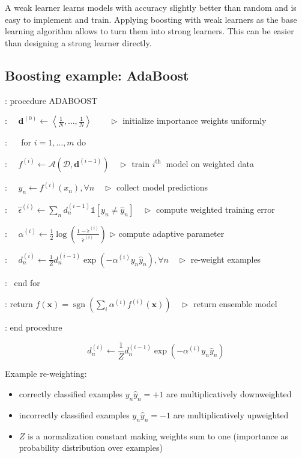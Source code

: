 \noindent
A weak learner learns models with accuracy slightly better than random and is
easy to implement and train. Applying boosting with weak learners as the base learning
algorithm allows to turn them into strong learners. This can be easier than
designing a strong learner directly.

\subsection{Boosting example: AdaBoost}

: procedure ADABOOST

:
$\quad \mathbf{d}^{(0)}\leftarrow\left\langle\frac{1}{N}, \ldots, \frac{1}{N}\right
\rangle \quad \quad \triangleright$
initialize importance weights uniformly

: $\quad$ for $i=1, \ldots, m$ do

:
$\quad f^{(i)}\leftarrow \mathcal{A}\left(\mathcal{D}, \mathbf{d}^{(i-1)}\right)
\quad \triangleright$
train $i^{\text{th }}$ model on weighted data

:
$\quad \hat{y}_{n}\leftarrow f^{(i)}\left(x_{n}\right), \forall n \quad \triangleright$
collect model predictions

:
$\quad \hat{\epsilon}^{(i)}\leftarrow \sum_{n}d_{n}^{(i-1)}\mathbb{1}\left[y_{n}\neq
\hat{y}_{n}\right] \quad \triangleright$
compute weighted training error

:
$\quad \alpha^{(i)}\leftarrow \frac{1}{2}\log \left(\frac{1-\hat{\epsilon}^{(i)}}{\hat{\epsilon}^{(i)}}
\right)$
$\triangleright$ compute adaptive parameter

:
$\quad d_{n}^{(i)}\leftarrow \frac{1}{Z}d_{n}^{(i-1)}\exp \left(-\alpha^{(i)}y_{n}
\hat{y}_{n}\right), \forall n \quad \triangleright$
re-weight examples

: \; \ end for

: \; return $f(\mathbf{x})=\operatorname{sgn}\left(\sum_{i}\alpha^{(i)}f^{(i)}(
\mathbf{x})\right) \quad \triangleright$ return ensemble model

: end procedure

\vspace{0.6cm}

\[
	d_{n}^{(i)}\leftarrow \frac{1}{Z}d_{n}^{(i-1)}\exp \left(-\alpha^{(i)}y_{n}\hat
	{y}_{n}\right)
\]

\noindent
Example re-weighting:
\begin{itemize}
	\item correctly classified examples $y_{n}\hat{y}_{n}=+1$ are multiplicatively
		downweighted

	\item incorrectly classified examples $y_{n}\hat{y}_{n}=-1$ are multiplicatively
		upweighted

	\item $Z$ is a normalization constant making weights sum to one (importance as
		probability distribution over examples)
\end{itemize}

